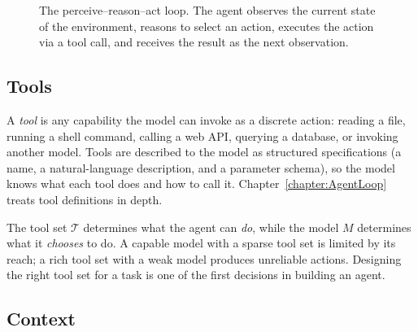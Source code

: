 \begin{figure}[htb!]
\begin{center}
\caption{The perceive--reason--act loop.
The agent observes the current state of the environment, reasons to select an action, executes the action via a tool call, and receives the result as the next observation.}
\label{figure:AgentLoop}
\end{center}
\end{figure}

\subsection{Tools}

A \emph{tool} is any capability the model can invoke as a discrete action: reading a file, running a shell command, calling a web API, querying a database, or invoking another model.
Tools are described to the model as structured specifications (a name, a natural-language description, and a parameter schema), so the model knows what each tool does and how to call it.
Chapter~\ref{chapter:AgentLoop} treats tool definitions in depth.

The tool set $\mathcal{T}$ determines what the agent can \emph{do}, while the model $M$ determines what it \emph{chooses} to do.
A capable model with a sparse tool set is limited by its reach; a rich tool set with a weak model produces unreliable actions.
Designing the right tool set for a task is one of the first decisions in building an agent.

\subsection{Context}

